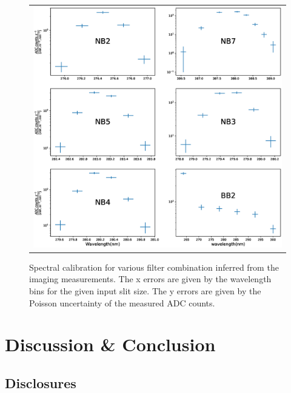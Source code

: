 \documentclass[12pt]{spieman}  %
\begin{document}
\begin{figure}[ht!]
\begin{center}
\begin{tabular}{c}
\includegraphics[trim={2.5cm 2.5cm 3cm 4cm},clip,width=\linewidth]{spec_calib.eps}
\end{tabular}
\end{center}
\caption 
{ \label{fig:sepc_calib} Spectral calibration for various filter combination inferred from the imaging measurements. The x errors are given by the wavelength bins for the given input slit size. The y errors are given by the Poisson uncertainty of the measured ADC counts.} 
\end{figure}

\section{Discussion \& Conclusion}\label{sec:conc}


\subsection*{Disclosures}
\end{document}
